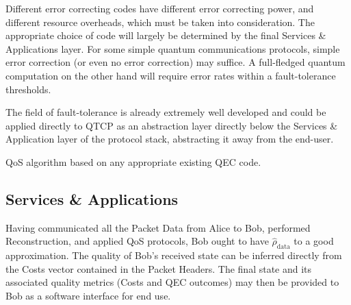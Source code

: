 \documentclass[aps,rmp,twocolumn,amsmath,amssymb,nofootinbib,superscriptaddress]{revtex4}
\begin{document}
Different error correcting codes have different error correcting power, and different resource overheads, which must be taken into consideration. The appropriate choice of code will largely be determined by the final {\sc Services \& Applications} layer. For some simple quantum communications protocols, simple error correction (or even no error correction) may suffice. A full-fledged quantum computation on the other hand will require error rates within a fault-tolerance thresholds.

The field of fault-tolerance is already extremely well developed and could be applied directly to QTCP as an abstraction layer directly below the {\sc Services \& Application} layer of the protocol stack, abstracting it away from the end-user.

\begin{table}[!htb]
\caption{QoS algorithm based on any appropriate existing QEC code.} \label{tab:qos}
\end{table}

%
%

\subsection{Services \& Applications}

Having communicated all the {\sc Packet Data} from Alice to Bob, performed {\sc Reconstruction}, and applied {\sc QoS} protocols, Bob ought to have $\hat\rho_\mathrm{data}$ to a good approximation. The quality of Bob's received state can be inferred directly from the {\sc Costs} vector contained in the {\sc Packet Headers}. The final state and its associated quality metrics ({\sc Costs} and QEC outcomes) may then be provided to Bob as a software interface for end use.
\end{document}
